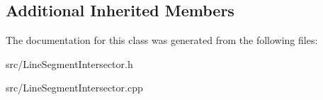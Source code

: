\subsection*{Additional Inherited Members}


The documentation for this class was generated from the following files\+:\begin{DoxyCompactItemize}
\item 
src/Line\+Segment\+Intersector.\+h\item 
src/Line\+Segment\+Intersector.\+cpp\end{DoxyCompactItemize}
